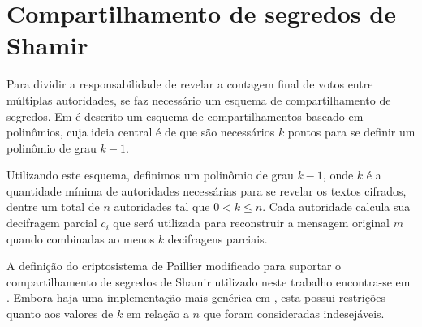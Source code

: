 \section{Compartilhamento de segredos de Shamir}

Para dividir a responsabilidade de revelar a contagem final de votos entre
múltiplas autoridades, se faz necessário um esquema de compartilhamento de
segredos. Em \textcite{Shamir:1979:SS:359168.359176} é descrito um esquema de
compartilhamentos baseado em polinômios, cuja ideia central é de que são
necessários $k$ pontos para se definir um polinômio de grau $k - 1$.

Utilizando este esquema, definimos um polinômio de grau $k - 1$, onde $k$ é a
quantidade mínima de autoridades necessárias para se revelar os textos
cifrados, dentre um total de $n$ autoridades tal que $0 < k \leq n$. Cada
autoridade calcula sua decifragem parcial $c_i$ que será utilizada para
reconstruir a mensagem original $m$ quando combinadas ao menos $k$ decifragens
parciais.

A definição do criptosistema de Paillier modificado para suportar o
compartilhamento de segredos de Shamir utilizado neste trabalho encontra-se em
\textcite{fouque2000sharing}. Embora haja uma implementação mais genérica em
\textcite{damgaard2010generalization}, esta possui restrições quanto aos
valores de $k$ em relação a $n$ que foram consideradas indesejáveis.
